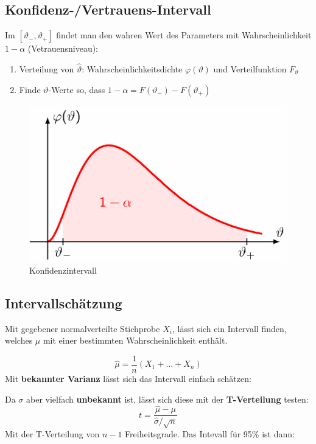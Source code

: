 \documentclass[../Main.tex]{subfiles}
\begin{document}
\subsection{Konfidenz-/Vertrauens-Intervall}
Im \([\vartheta_-,\vartheta_+]\) findet man den wahren Wert des
Parameters mit Wahrscheinlichkeit \(1-\alpha\) (Vetrauensniveau):
\begin{enumerate}
    \item Verteilung von \(\hat{\vartheta}\): Wahrscheinlichkeitsdichte
    \(\varphi(\vartheta)\) und Verteilfunktion \(F_\vartheta\)
    \item Finde \(\vartheta\)-Werte so, dass \(1-\alpha=F(\vartheta_-)-F(\vartheta_+)\)
\end{enumerate}

\begin{figure}[H]
    \centering
    \includegraphics[width=0.5\linewidth]{Images/konfidenzintervall.png}
    \caption{Konfidenzintervall}
\end{figure}



\subsection{Intervallschätzung}
Mit gegebener normalverteilte Stichprobe \(X_i\), lässt sich ein
Intervall finden, welches \(\mu\) mit einer bestimmten Wahrscheinlichkeit enthält.

\begin{equation}
    \hat{\mu} = \frac{1}{n}(X_1+\dots+X_n)
\end{equation} 
Mit \textbf{bekannter Varianz} lässt sich das Intervall einfach schätzen:
\begin{equation}
    [\hat{\mu}-1.96\frac{\sigma}{\sqrt{n}},\hat{\mu}+1.96\frac{\sigma}{\sqrt{n}}]
\end{equation}

Da \(\sigma\) aber vielfach \textbf{unbekannt} ist, lässt sich diese mit der \textbf{T-Verteilung} testen:
\begin{equation}
    t = \frac{\hat{\mu}-\mu}{\hat{\sigma}/\sqrt{n}}
\end{equation} 
Mit der T-Verteilung von \(n-1\) Freiheitsgrade. Das Intevall für 95\% ist dann:
\begin{equation}
    [\hat{\mu}+t_{-}\frac{\sigma}{\sqrt{n}},\hat{\mu}+t_{+}\frac{\sigma}{\sqrt{n}}]
\end{equation}
\end{document}
